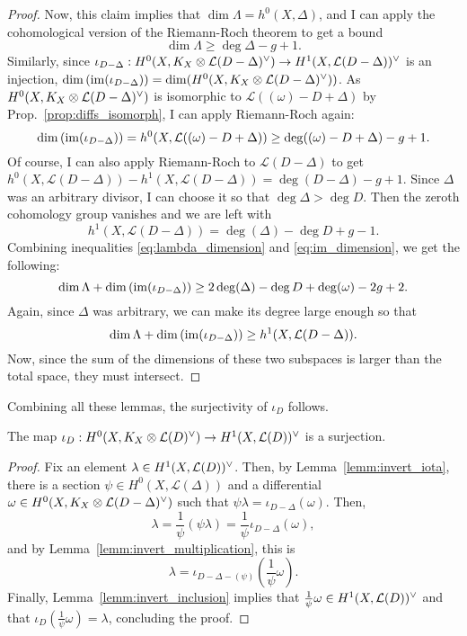 \begin{proof}
  Now, this claim implies that $\dim\Lambda=h^{0}(X,\Delta)$, and I can apply
  the cohomological version of the Riemann-Roch theorem to get a bound
  \begin{equation}\label{eq:lambda_dimension}
    \dim\Lambda\geq \deg{\Delta}-g+1.
  \end{equation}
  Similarly, since $\iota_{D-\Delta}:H^0(X,K_X\otimes\mathcal{L}(D-\Delta)^{\vee})\to H^1(X,\mathcal{L}(D-\Delta))^{\vee}$
  is an injection, $\dim\left(\operatorname{im}(\iota_{D-\Delta})\right)
  =\dim(H^0(X,K_X\otimes\mathcal{L}(D-\Delta)^{\vee}))$. As $H^0(X,K_X\otimes\mathcal{L}(D-\Delta)^{\vee})$ is isomorphic to
  $\mathcal{L}((\omega)-D+\Delta)$ by Prop.~\ref{prop:diffs_isomorph},
  I can apply Riemann-Roch again:
  \begin{equation}\label{eq:im_dimension}
    \dim\left(\operatorname{im}(\iota_{D-\Delta})\right)
    =h^{0}(X,\mathcal{L}((\omega)-D+\Delta))\geq \deg((\omega)-D+\Delta)-g+1.
  \end{equation}
  Of course, I can also apply Riemann-Roch to $\mathcal{L}(D-\Delta)$
  to get $h^{0}(X,\mathcal{L}(D-\Delta))-h^{1}(X,\mathcal{L}(D-\Delta))
  =\deg(D-\Delta)-g+1$. Since $\Delta$ was an arbitrary divisor, I can
  choose it so that $\deg\Delta >\deg D$. Then the zeroth cohomology
  group vanishes and we are left with
  \begin{equation}\label{eq:fst_dimension}
    h^{1}(X,\mathcal{L}(D-\Delta))=\deg(\Delta)-\deg D+g-1.
  \end{equation}
  Combining inequalities \eqref{eq:lambda_dimension} and
  \eqref{eq:im_dimension}, we get the following:
  \[
    \dim\Lambda+\dim\left(\operatorname{im}(\iota_{D-\Delta})\right)
    \geq 2\deg(\Delta)-\deg D+\deg(\omega)-2g+2.
  \]
  Again, since $\Delta$ was arbitrary, we can make its degree large enough
  so that
  \[
    \dim\Lambda+\dim\left(\operatorname{im}(\iota_{D-\Delta})\right)
    \geq h^{1}(X,\mathcal{L}(D-\Delta)).
  \]
  Now, since the sum of the dimensions of these two subspaces is larger
  than the total space, they must intersect.
\end{proof}
Combining all these lemmas, the surjectivity of $\iota_{D}$ follows.
\begin{prop}\label{prop:surjectivity}
  The map $\iota_{D}:H^0(X,K_X\otimes\mathcal{L}(D)^{\vee})\to H^1(X,\mathcal{L}(D))^{\vee}$ is a surjection.
\end{prop}
\begin{proof}
  Fix an element $\lambda\in H^1(X,\mathcal{L}(D))^{\vee}$. Then, by Lemma~\ref{lemm:invert_iota},
  there is a section $\psi\in H^{0}(X,\mathcal{L}(\Delta))$ and a differential
  $\omega\in H^0(X,K_X\otimes\mathcal{L}(D-\Delta)^{\vee})$ such that $\psi\lambda=\iota_{D-\Delta}(\omega)$.
  Then,
  \[\lambda=\frac1{\psi}(\psi\lambda)=\frac1{\psi}\iota_{D-\Delta}(\omega),\]
  and by Lemma~\ref{lemm:invert_multiplication}, this is
  \[\lambda=\iota_{D-\Delta-(\psi)}(\frac1{\psi}\omega).\]
  Finally, Lemma~\ref{lemm:invert_inclusion} implies that
  $\frac1{\psi}\omega\in H^1(X,\mathcal{L}(D))^{\vee}$ and that $\iota_{D}(\frac1{\psi}\omega)
  =\lambda$, concluding the proof.
\end{proof}
